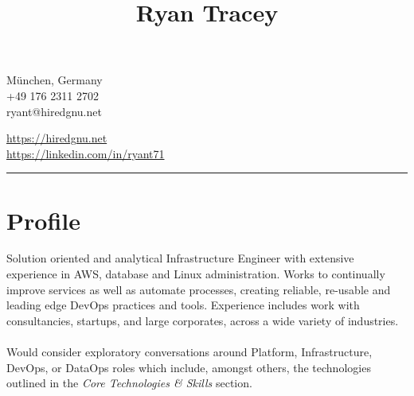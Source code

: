 \documentclass[10pt]{article}
\title{\bfseries\huge Ryan Tracey}
\author{}
\date{}
\begin{document}
\maketitle
\begin{minipage}[ht]{0.48\textwidth}
München, Germany\\
\Mobilefone\hspace{5pt}+49 176 2311 2702\\
\hspace{5pt}ryant@hiredgnu.net\\
\end{minipage}
\begin{minipage}[ht]{0.48\textwidth}
\hspace{5pt}\url{https://hiredgnu.net}\\
\hspace{5pt}\url{https://linkedin.com/in/ryant71}\\
\color{red}{\Bat}\hspace{2pt}\male
\end{minipage}
\vspace{20pt}
\hrule
\vspace{10pt}
\section*{Profile}
Solution oriented and analytical Infrastructure Engineer with extensive experience in AWS, database and Linux administration. Works to continually improve services as well as automate processes, creating reliable, re-usable and leading edge DevOps practices and tools.
Experience includes work with consultancies, startups, and large corporates, across a wide variety of industries.\\\\
Would consider exploratory conversations around Platform, Infrastructure, DevOps, or DataOps roles which include, amongst others, the technologies outlined in the \textit{Core Technologies  \& Skills} section.
\end{document}
